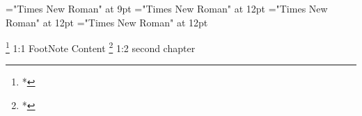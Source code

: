 \documentclass{article}
\begin{document}
 
\thispagestyle{empty} 
\font\footnotepsectionscriptureTextscrBody="Times New Roman" at 9pt
\font\psectionscriptureTextscrBody="Times New Roman" at 12pt
\font\sectionscriptureTextscrBody="Times New Roman" at 12pt
\font\scriptureTextscrBody="Times New Roman" at 12pt

  \footnote {*} {1:1 FootNote Content }  \footnote {*} {1:2 second chapter
                   }
\end{document}
